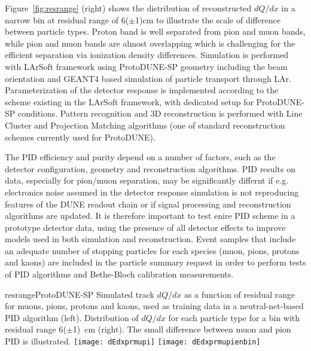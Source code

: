 \begin{itemize}
Figure~\ref{fig:resrange} (right) shows the distribution of reconstructed $dQ/dx$ in a narrow bin at residual range of 6($\pm$1)cm to illustrate the scale of difference between particle types. Proton band is well separated from pion and muon bands, while pion and muon bands are almost overlapping which is challenging for the efficient separation via ionization density differences. 
Simulation is performed with LArSoft framework using ProtoDUNE-SP geometry including the beam orientation and GEANT4 based simulation of particle transport through LAr. Parameterization of the detector response is implemented according to the scheme existing in the LArSoft framework, with dedicated setup for ProtoDUNE-SP conditions. Pattern recognition and 3D reconstruction is performed with Line Cluster and Projection Matching algorithms (one of standard reconstruction schemes currently used for ProtoDUNE).

The PID efficiency and purity depend on a number of factors, such as the detector configuration, geometry and reconstruction algorithms. PID results on data, especially for pion/muon separation, may be significantly differnt if e.g. electronics noise assumed in the detector response simulation is not reproducing features of the DUNE readout chain or if signal processing and reconstruction algorithms are updated. It is therefore important to test enire PID scheme in a prototype detector data, using the presence of all detector effects to improve models used in both simulation and reconstruction. Event samples that include an adequate number of stopping particles for each species
(muon, pions, protons and kaons) are included in the particle summary request in order to perform tests of PID algorithms and Bethe-Bloch calibration measurements.

\begin{cdrfigure}{resrange}{ProtoDUNE-SP Simulated track $dQ/dx$ as a function of residual range for muons, pions, protons and kaons, used as training data in a neutral-net-based PID algorithm (left). Distribution of $dQ/dx$ for each particle type for a bin with residual range 
6($\pm$1)~cm (right). The small difference between muon and pion PID is illustrated.}
\texttt{[image: dEdxprmupi]}
\texttt{[image: dEdxprmupienbin]}
\end{cdrfigure}



\end{itemize}
